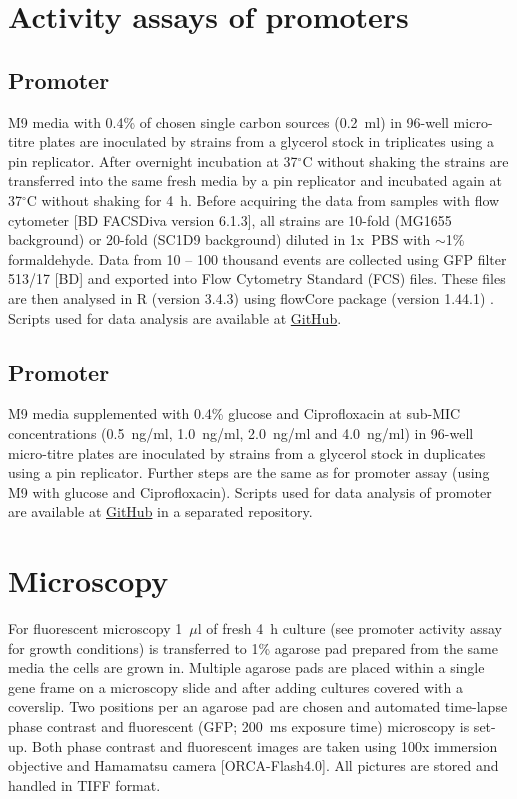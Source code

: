 \section{Activity assays of promoters}
\subsection{Promoter }
M9 media with 0.4\% of chosen single carbon sources (0.2~ml) in 96-well micro-titre plates are inoculated by strains from a glycerol stock in triplicates using a pin replicator.
After overnight incubation at 37$^{\circ}$C without shaking the strains are transferred into the same fresh media by a pin replicator and incubated again at 37$^{\circ}$C without shaking for 4~h.
Before acquiring the data from samples with flow cytometer [BD FACSDiva version 6.1.3], all strains are 10-fold (MG1655 background) or 20-fold (SC1\textunderscore D9 background) diluted in 1x~PBS with $\sim$1\% formaldehyde.
Data from 10 -- 100 thousand events are collected using GFP filter 513/17 [BD] and exported into Flow Cytometry Standard (FCS) files.
These files are then analysed in R (version 3.4.3) using flowCore package (version 1.44.1) \cite{hahne2009flowcore}.
Scripts used for data analysis are available at \href{https://github.com/marketavlkova/LacZ_FC}{GitHub}.

\subsection{Promoter }
M9 media supplemented with 0.4\% glucose and Ciprofloxacin at sub-MIC concentrations (0.5~ng/ml, 1.0~ng/ml, 2.0~ng/ml and 4.0~ng/ml) in 96-well micro-titre plates are inoculated by strains from a glycerol stock in duplicates using a pin replicator.
Further steps are the same as for  promoter assay (using M9 with glucose and Ciprofloxacin).
Scripts used for data analysis of  promoter are available at \href{https://github.com/marketavlkova/RecA}{GitHub} in a separated repository.


\section{Microscopy}
For fluorescent microscopy 1~$\mu$l of fresh 4~h culture (see promoter activity assay for growth conditions) is transferred to 1\% agarose pad prepared from the same media the cells are grown in.
Multiple agarose pads are placed within a single gene frame on a microscopy slide and after adding cultures covered with a coverslip.
Two positions per an agarose pad are chosen and automated time-lapse phase contrast and fluorescent (GFP; 200~ms exposure time) microscopy is set-up.
Both phase contrast and fluorescent images are taken using 100x immersion objective and Hamamatsu camera [ORCA-Flash4.0].
All pictures are stored and handled in TIFF format.

\shorthandon{-}

